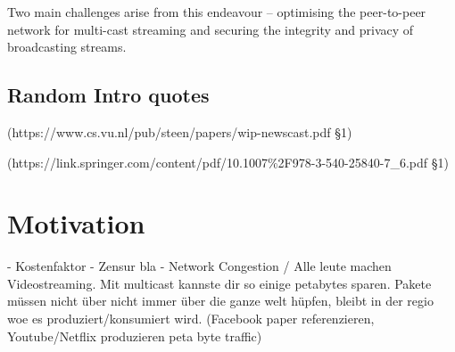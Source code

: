 Two main challenges arise from this endeavour – optimising the peer-to-peer network for multi-cast streaming and securing the integrity and privacy of broadcasting streams.

\section{Random Intro quotes}
 (https://www.cs.vu.nl/pub/steen/papers/wip-newscast.pdf \S1)

(https://link.springer.com/content/pdf/10.1007\%2F978-3-540-25840-7\_6.pdf \S1)

\chapter{Motivation}
- Kostenfaktor
- Zensur bla
- Network Congestion / Alle leute machen Videostreaming. Mit multicast kannste dir so einige petabytes sparen. Pakete müssen nicht über nicht immer über die ganze welt hüpfen, bleibt in der regio woe es produziert/konsumiert wird. (Facebook paper referenzieren, Youtube/Netflix produzieren peta byte traffic)
